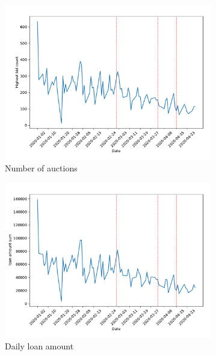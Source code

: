 \documentclass[11pt,a4paper]{article}
\begin{document}
\begin{figure}[h]
  \centering
  \begin{subfigure}[b]{0.49\textwidth}
      \includegraphics[width=0.998\textwidth]{../results/figures/winner_bid_count_mat30_loan1_timeseries_nr_4_4.75.pdf}
      \caption{ Number of auctions}
     \end{subfigure}
     \begin{subfigure}[b]{0.49\textwidth}
      \includegraphics[width=0.998\textwidth]{../results/figures/LoanAmount_sum_mat30_loan1_timeseries_nr_4_4.75.pdf}
      \caption{ Daily loan amount}
     \end{subfigure}
     \begin{subfigure}[b]{0.49\textwidth}

\end{subfigure}
\end{figure}
\end{document}
